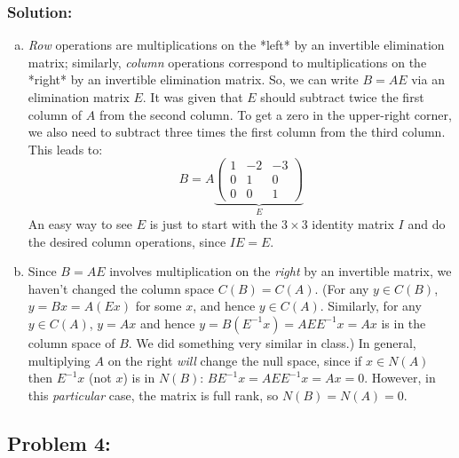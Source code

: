 \documentclass{article}
\begin{document}
\subsubsection*{Solution:}

\begin{enumerate}[(a)]
\item \emph{Row} operations are multiplications on the *left* by an invertible elimination matrix; similarly, \emph{column} operations correspond to multiplications on the *right* by an invertible elimination matrix.  So, we can write $B=AE$ via an elimination matrix $E$.  It was given that $E$ should subtract twice the first column of $A$ from the second column.  To get a zero in the upper-right corner, we also need to subtract three times the first column from the third column.  This leads to:
  $$
  B = A \underbrace{\begin{pmatrix} 1 & -2 & -3 \\ 0 & 1 & 0 \\ 0 & 0 & 1 \end{pmatrix}}_E
  $$
An easy way to see $E$ is just to start with the $3\times 3$ identity matrix $I$ and do the desired column operations, since $IE = E$.

\item Since $B=AE$ involves multiplication on the \emph{right} by an invertible matrix, we haven't changed the column space $C(B)=C(A)$. (For any $y \in C(B)$, $y=Bx=A(Ex)$ for some $x$, and hence $y\in C(A)$.  Similarly, for any $y \in C(A)$, $y=Ax$ and hence $y = B(E^{-1}x) = AEE^{-1}x = Ax$ is in the column space of $B$.  We did something very similar in class.)   In general, multiplying $A$ on the right \emph{will} change the null space, since if $x \in N(A)$ then $E^{-1}x$ (not $x$) is in $N(B)$: $BE^{-1}x = AEE^{-1}x = Ax = 0$.   However, in this \emph{particular} case, the matrix is full rank, so $N(B)=N(A)={0}$.

\end{enumerate}


\subsection*{Problem 4:}
\end{document}
